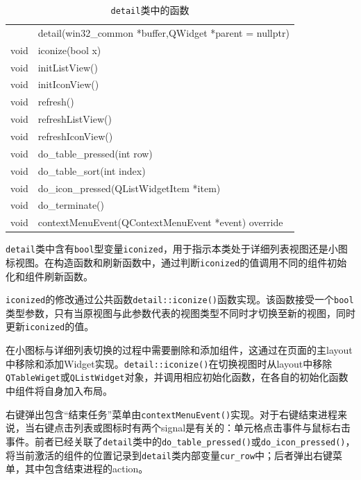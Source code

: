 \documentclass[UTF8,twoside,titlepage]{ctexart}
\newcommand\code[1]{\texttt{#1}}
\begin{document}
\begin{table}
    \centering
    \ttfamily
    \begin{tabular}{rl}
        \hline
            & detail(win32\_common *buffer,QWidget *parent = nullptr) \\
        void & iconize(bool x) \\    
        void & initListView() \\
        void & initIconView() \\
        void & refresh() \\
        void & refreshListView() \\
        void & refreshIconView() \\
        void & do\_table\_pressed(int row) \\
        void & do\_table\_sort(int index) \\
        void & do\_icon\_pressed(QListWidgetItem *item) \\
        void & do\_terminate() \\ 
        void & contextMenuEvent(QContextMenuEvent *event) override \\
        \hline       
    \end{tabular}
    \caption{\code{detail}类中的函数}
    \label{table:detailfunc}
\end{table}

\code{detail}类中含有\code{bool}型变量\code{iconized}，用于指示本类处于详细列表视图还是小图标视图。在构造函数和刷新函数中，通过判断\code{iconized}的值调用不同的组件初始化和组件刷新函数。

\code{iconized}的修改通过公共函数\code{detail::iconize()}函数实现。该函数接受一个\code{bool}类型参数，只有当原视图与此参数代表的视图类型不同时才切换至新的视图，同时更新\code{iconized}的值。

在小图标与详细列表切换的过程中需要删除和添加组件，这通过在页面的主layout中移除和添加Widget实现。\code{detail::iconize()}在切换视图时从layout中移除\code{QTableWiget}或\code{QListWidget}对象，并调用相应初始化函数，在各自的初始化函数中组件将自身加入布局。

右键弹出包含``结束任务''菜单由\code{contextMenuEvent()}实现。对于右键结束进程来说，当右键点击列表或图标时有两个signal是有关的：单元格点击事件与鼠标右击事件。前者已经关联了\code{detail}类中的\code{do\_table\_pressed()}或\code{do\_icon\_pressed()}，将当前激活的组件的位置记录到\code{detail}类内部变量\code{cur\_row}中；后者弹出右键菜单，其中包含结束进程的action。

{   
    \ttfamily
    
}
\end{document}
